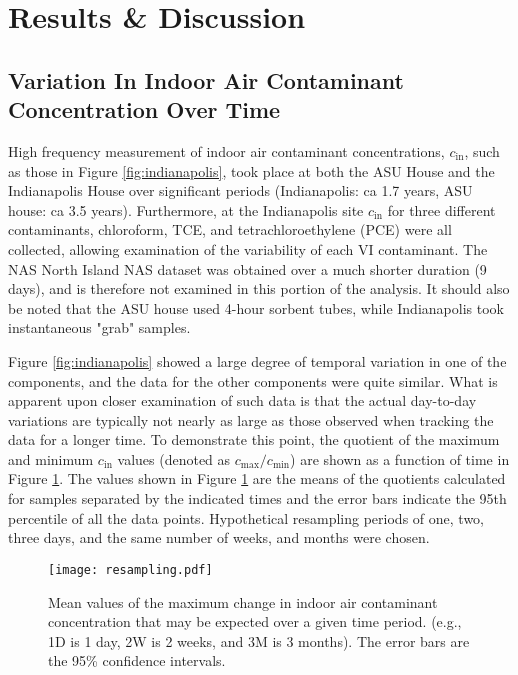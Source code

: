 \section{Results \& Discussion}\label{s:results}

\subsection{Variation In Indoor Air Contaminant Concentration Over Time}\label{s:results_variation_time}

High frequency measurement of indoor air contaminant concentrations, $c_\mathrm{in}$, such as those in Figure \ref{fig:indianapolis}, took place at both the ASU House and the Indianapolis House over significant periods (Indianapolis: ca 1.7 years, ASU house: ca 3.5 years)\cite{u.s._environmental_protection_agency_assessment_2015,holton_temporal_2013}.
Furthermore, at the Indianapolis site $c_\mathrm{in}$ for three different contaminants, chloroform, TCE, and tetrachloroethylene (PCE) were all collected, allowing examination of the variability of each VI contaminant.
The NAS North Island NAS dataset was obtained over a much shorter duration (9 days), and is therefore not examined in this portion of the analysis.
It should also be noted that the ASU house used 4-hour sorbent tubes, while Indianapolis took instantaneous "grab" samples.\par

Figure \ref{fig:indianapolis} showed a large degree of temporal variation in one of the components, and the data for the other components were quite similar.
What is apparent upon closer examination of such data is that the actual day-to-day variations are typically not nearly as large as those observed when tracking the data for a longer time.
To demonstrate this point, the quotient of the maximum and minimum $c_\mathrm{in}$ values (denoted as $c_\mathrm{max}/c_\mathrm{min}$) are shown as a function of time in Figure \ref{fig:resampling}.
The values shown in Figure \ref{fig:resampling} are the means of the quotients calculated for samples separated by the indicated times and the error bars indicate the 95th percentile of all the data points.
Hypothetical resampling periods of one, two, three days, and the same number of weeks, and months were chosen.\par

\begin{figure}[htb!]
 \centering
 \texttt{[image: resampling.pdf]}
 \caption{Mean values of the maximum change in indoor air contaminant concentration that may be expected over a given time period. (e.g., 1D is 1 day, 2W is 2 weeks, and 3M is 3 months). The error bars are the 95\% confidence intervals.}\label{fig:resampling}
\end{figure}

